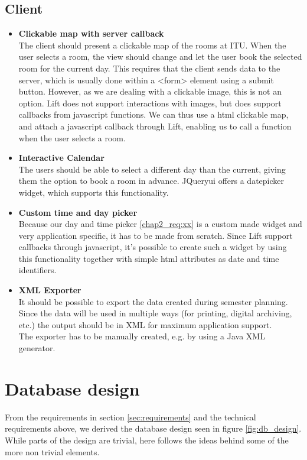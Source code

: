 \subsection{Client}
\label{sub:req_client}
\begin{itemize}
	\item \textbf{Clickable map with server callback}\\
	The client should present a clickable map of the rooms at ITU. When the user selects a room, the view should change and let the user book the selected room for the current day. This requires that the client sends data to the server, which is usually done within a <form> element using a submit button. However, as we are dealing with a clickable image, this is not an option. Lift does not support interactions with images, but does support callbacks from javascript functions. We can thus use a html clickable map\cite{html_map}, and attach a javascript callback through Lift, enabling us to call a function when the user selects a room.
	\item \textbf{Interactive Calendar}\\
	The users should be able to select a different day than the current, giving them the option to book a room in advance. JQueryui\cite{jqueryui} offers a datepicker widget\cite{jqueryui_date}, which supports this functionality.
	\item \textbf{Custom time and day picker}\\
	Because our day and time picker \ref{chap2_req:xx} is a custom made widget and very application specific, it has to be made from scratch. Since Lift support callbacks through javascript, it's possible to create such a widget by using this functionality together with simple html attributes as date and time identifiers.
	\item \textbf{XML Exporter}\\
	It should be possible to export the data created during semester planning. Since the data will be used in multiple ways (for printing, digital archiving, etc.) the output should be in XML for maximum application support.\\ 
The exporter has to be manually created, e.g. by using a Java XML generator.
\end{itemize}

\section{Database design}
\label{sec:database_design}
From the requirements in section \ref{sec:requirements} and the technical requirements above, we derived the database design seen in figure \ref{fig:db_design}. While parts of the design are trivial, here follows the ideas behind some of the more non trivial elements.

